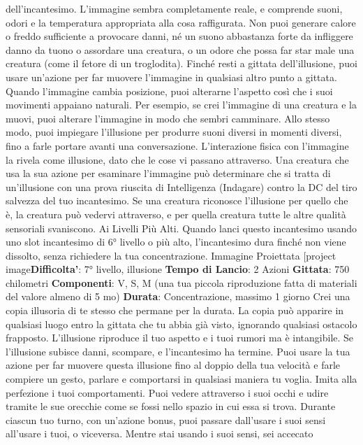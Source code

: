 \begin{multicols}{2}
dell’incantesimo. L’immagine sembra completamente
reale, e comprende suoni, odori e la temperatura
appropriata alla cosa raffigurata. Non puoi generare
calore o freddo sufficiente a provocare danni, né un
suono abbastanza forte da infliggere danno da tuono o
assordare una creatura, o un odore che possa far star
male una creatura (come il fetore di un troglodita).
Finché resti a gittata dell’illusione, puoi usare un’azione
per far muovere l’immagine in qualsiasi altro punto a
gittata. Quando l’immagine cambia posizione, puoi
alterarne l’aspetto così che i suoi movimenti appaiano
naturali. Per esempio, se crei l’immagine di una
creatura e la muovi, puoi alterare l’immagine in modo
che sembri camminare. Allo stesso modo, puoi
impiegare l’illusione per produrre suoni diversi in
momenti diversi, fino a farle portare avanti una
conversazione.
L’interazione fisica con l’immagine la rivela come
illusione, dato che le cose vi passano attraverso. Una
creatura che usa la sua azione per esaminare
l’immagine può determinare che si tratta di un’illusione
con una prova riuscita di Intelligenza (Indagare) contro
la DC del tiro salvezza del tuo incantesimo. Se una
creatura riconosce l’illusione per quello che è, la
creatura può vedervi attraverso, e per quella creatura
tutte le altre qualità sensoriali svaniscono.
Ai Livelli Più Alti. Quando lanci questo incantesimo
usando uno slot incantesimo di 6° livello o più alto,
l’incantesimo dura finché non viene dissolto, senza
richiedere la tua concentrazione.
Immagine Proiettata
[project image\textbf{Difficolta'}:
7° livello, illusione
\textbf{Tempo di Lancio}: 2 Azioni
\textbf{Gittata}: 750 chilometri
\textbf{Componenti}: V, S, M (una tua piccola riproduzione
fatta di materiali del valore almeno di 5 mo)
\textbf{Durata}: Concentrazione, massimo 1 giorno
Crei una copia illusoria di te stesso che permane per la
durata. La copia può apparire in qualsiasi luogo entro la
gittata che tu abbia già visto, ignorando qualsiasi
ostacolo frapposto. L’illusione riproduce il tuo aspetto e
i tuoi rumori ma è intangibile. Se l’illusione subisce
danni, scompare, e l’incantesimo ha termine.
Puoi usare la tua azione per far muovere questa
illusione fino al doppio della tua velocità e farle
compiere un gesto, parlare e comportarsi in qualsiasi
maniera tu voglia. Imita alla perfezione i tuoi
comportamenti.
Puoi vedere attraverso i suoi occhi e udire tramite le
sue orecchie come se fossi nello spazio in cui essa si
trova. Durante ciascun tuo turno, con un’azione bonus,
puoi passare dall’usare i suoi sensi all’usare i tuoi, o
viceversa. Mentre stai usando i suoi sensi, sei accecato

\end{multicols}
